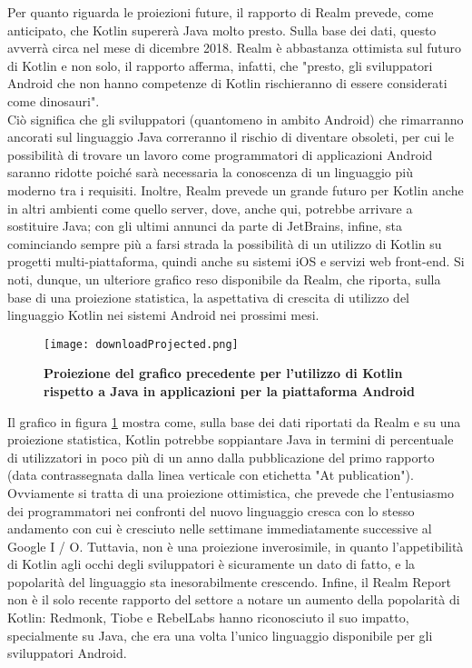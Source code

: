Per quanto riguarda le proiezioni future, il rapporto di Realm prevede, come anticipato, che Kotlin supererà Java molto presto. Sulla base dei dati, questo avverrà circa nel mese di dicembre 2018. Realm è abbastanza ottimista sul futuro di Kotlin e non solo, il rapporto afferma, infatti, che "presto, gli sviluppatori Android che non hanno competenze di Kotlin rischieranno di essere considerati come dinosauri".\\
Ciò significa che gli sviluppatori (quantomeno in ambito Android) che rimarranno ancorati sul linguaggio Java correranno il rischio di diventare obsoleti, per cui le possibilità di trovare un lavoro come programmatori di applicazioni Android saranno ridotte poiché sarà necessaria la conoscenza di un linguaggio più moderno tra i requisiti. Inoltre, Realm prevede un grande futuro per Kotlin anche in altri ambienti come quello server, dove, anche qui, potrebbe arrivare a sostituire Java; con gli ultimi annunci da parte di JetBrains, infine, sta cominciando sempre più a farsi strada la possibilità di un utilizzo di Kotlin su progetti multi-piattaforma, quindi anche su sistemi iOS e servizi web front-end.
Si noti, dunque, un ulteriore grafico reso disponibile da Realm, che riporta, sulla base di una proiezione statistica, la aspettativa di crescita di utilizzo del linguaggio Kotlin nei sistemi Android nei prossimi mesi.\\

\begin{figure}[ht]
  \centering
  \texttt{[image: downloadProjected.png]}
  \caption{{\bfseries Proiezione del grafico precedente per l'utilizzo di Kotlin rispetto a Java in applicazioni per la piattaforma Android}}
  \label{projected}
\end{figure}

Il grafico in figura \ref{projected} mostra come, sulla base dei dati riportati da Realm e su una proiezione statistica, Kotlin potrebbe soppiantare Java in termini di percentuale di utilizzatori in poco più di un anno dalla pubblicazione del primo rapporto (data contrassegnata dalla linea verticale con etichetta "At publication"). Ovviamente si tratta di una proiezione ottimistica, che prevede che l'entusiasmo dei programmatori nei confronti del nuovo linguaggio cresca con lo stesso andamento con cui è cresciuto nelle settimane immediatamente successive al Google I / O. Tuttavia, non è una proiezione inverosimile, in quanto l'appetibilità di Kotlin agli occhi degli sviluppatori è sicuramente un dato di fatto, e la popolarità del linguaggio sta inesorabilmente crescendo. Infine, il Realm Report non è il solo recente rapporto del settore a notare un aumento della popolarità di Kotlin: Redmonk, Tiobe e RebelLabs hanno riconosciuto il suo impatto, specialmente su Java, che era una volta l'unico linguaggio disponibile per gli sviluppatori Android.
